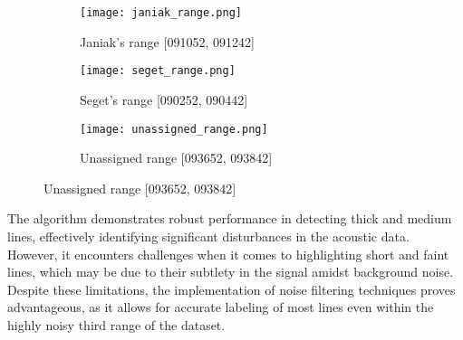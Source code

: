 \documentclass{article}
\begin{document}
\begin{figure}[htbp]
    \centering
    \begin{subfigure}{0.45\textwidth}
        \centering
        \texttt{[image: janiak\_range.png]}
        \caption{Janiak's range [091052, 091242]}
        \label{fig:sub1}
    \end{subfigure}
    \hfill
    \begin{subfigure}{0.45\textwidth}
        \centering
        \texttt{[image: seget\_range.png]}
        \caption{Seget's range [090252, 090442]}
        \label{fig:sub2}
    \end{subfigure}

    \begin{subfigure}{0.45\textwidth}
        \centering
        \texttt{[image: unassigned\_range.png]}
        \caption{Unassigned range [093652, 093842]}
        \label{fig:sub3}
    \end{subfigure}

\end{figure}

The algorithm demonstrates robust performance in detecting thick and medium lines, effectively identifying significant disturbances in the acoustic data. However, it encounters challenges when it comes to highlighting short and faint lines, which may be due to their subtlety in the signal amidst background noise. Despite these limitations, the implementation of noise filtering techniques proves advantageous, as it allows for accurate labeling of most lines even within the highly noisy third range of the dataset.

\newpage
\end{document}

